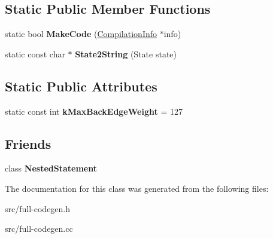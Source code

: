 \subsection*{Static Public Member Functions}
\begin{DoxyCompactItemize}
\item 
\hypertarget{classv8_1_1internal_1_1_full_code_generator_a37671dc542ebcb8c8f182ca4c697efda}{}static bool {\bfseries Make\+Code} (\hyperlink{classv8_1_1internal_1_1_compilation_info}{Compilation\+Info} $\ast$info)\label{classv8_1_1internal_1_1_full_code_generator_a37671dc542ebcb8c8f182ca4c697efda}

\item 
\hypertarget{classv8_1_1internal_1_1_full_code_generator_aa4207f08ba12f962f015b5cd82fc0993}{}static const char $\ast$ {\bfseries State2\+String} (State state)\label{classv8_1_1internal_1_1_full_code_generator_aa4207f08ba12f962f015b5cd82fc0993}

\end{DoxyCompactItemize}
\subsection*{Static Public Attributes}
\begin{DoxyCompactItemize}
\item 
\hypertarget{classv8_1_1internal_1_1_full_code_generator_a00b2d79958759123bf732ba47d12fc6d}{}static const int {\bfseries k\+Max\+Back\+Edge\+Weight} = 127\label{classv8_1_1internal_1_1_full_code_generator_a00b2d79958759123bf732ba47d12fc6d}

\end{DoxyCompactItemize}
\subsection*{Friends}
\begin{DoxyCompactItemize}
\item 
\hypertarget{classv8_1_1internal_1_1_full_code_generator_a37802c943aa0c4c8effa841248b479f2}{}class {\bfseries Nested\+Statement}\label{classv8_1_1internal_1_1_full_code_generator_a37802c943aa0c4c8effa841248b479f2}

\end{DoxyCompactItemize}


The documentation for this class was generated from the following files\+:\begin{DoxyCompactItemize}
\item 
src/full-\/codegen.\+h\item 
src/full-\/codegen.\+cc\end{DoxyCompactItemize}
